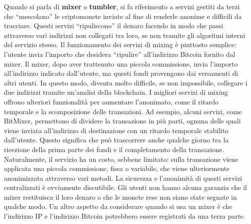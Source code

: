 Quando si parla di \textbf{mixer} o \textbf{tumbler}, si fa riferimento a servizi gestiti da terzi che “mescolano” le criptomonete inviate al fine di renderle anonime e difficili da tracciare. Questi servizi “ripuliscono” il denaro facendo in modo che passi attraverso vari indirizzi non collegati tra loro, se non tramite gli algoritmi interni del servizio stesso.
Il funzionamento dei servizi di mixing è piuttosto semplice: l'utente invia l'importo che desidera “ripulire” all'indirizzo Bitcoin fornito dal mixer. Il mixer, dopo aver trattenuto una piccola commissione, invia l'importo all'indirizzo indicato dall'utente, ma questi fondi provengono dai versamenti di altri utenti. In questo modo, diventa molto difficile, se non impossibile, collegare i due indirizzi tramite un'analisi della blockchain.
I migliori servizi di mixing offrono ulteriori funzionalità per aumentare l'anonimato, come il ritardo temporale e la scomposizione delle transazioni. Ad esempio, alcuni servizi, come BitMixer, permettono di dividere la transazione in più parti, ognuna delle quali viene inviata all'indirizzo di destinazione con un ritardo temporale stabilito dall'utente. Questo significa che può trascorrere anche qualche giorno tra la ricezione della prima parte dei fondi e il completamento della transazione. 
Naturalmente, il servizio ha un costo, sebbene limitato: sulla transazione viene applicata una piccola commissione, fissa o variabile, che viene ulteriormente anonimizzata attraverso vari metodi.
La sicurezza e l'anonimità di questi servizi centralizzati è ovviamente discutibile. Gli utenti non hanno alcuna garanzia che il mixer restituisca il loro denaro o che le monete rese non siano state segnate in qualche modo. Un altro aspetto da considerare quando si usa un mixer è che l'indirizzo IP e l'indirizzo Bitcoin potrebbero essere registrati da una terza parte. 

